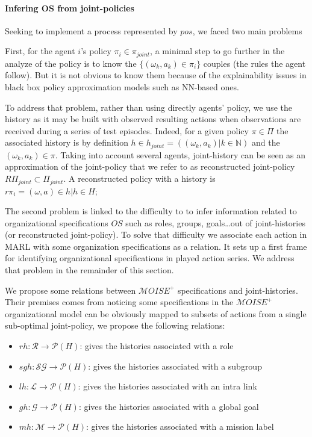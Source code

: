 \documentclass{ecai}
\newcounter{relation}
\begin{document}
\paragraph{\textbf{Infering OS from joint-policies}}

Seeking to implement a process represented by $pos$, we faced two main problems

First, for the agent $i$'s policy $\pi_{i} \in \pi_{joint}$, a minimal step to go further in the analyze of the policy is to know the $\{(\omega_k, a_k) \in \pi_{i}\}$ couples (the rules the agent follow). But it is not obvious to know them because of the explainability issues in black box policy approximation models such as NN-based ones.

To address that problem, rather than using directly agents' policy, we use the history as it may be built with observed resulting actions when observations are received during a series of test episodes. Indeed, for a given policy $\pi \in \Pi$ the associated history is by definition $h \in h_{joint} = ((\omega_k,a_k) | k \in \mathbb{N})$ and the $(\omega_k,a_k) \in \pi$. Taking into account several agents, joint-history can be seen as an approximation of the joint-policy that we refer to as reconstructed joint-policy $R\Pi_{joint} \subset \Pi_{joint}$. A reconstructed policy with a history is $r\pi_i = {(\omega, a) \in h | h \in H}$;

The second problem is linked to the difficulty to to infer information related to organizational specifications $OS$ such as roles, groups, goals\dots out of joint-histories (or reconstructed joint-policy).
To solve that difficulty we associate each action in MARL with some organization specifications as a  relation. It sets up a first frame for identifying organizational specifications in played action series. We address that problem in the remainder of this section.

We propose some relations between $\mathcal{M}OISE^+$ specifications and joint-histories. Their premises comes from noticing some specifications in the $\mathcal{M}OISE^+$ organizational model can be obviously mapped to subsets of actions from a single sub-optimal joint-policy, we propose the following relations:

\begin{itemize}
    \item $rh: \mathcal{R} \rightarrow \mathcal{P}(H)$: gives the histories associated with a role
    \item $sgh: \mathcal{SG} \rightarrow \mathcal{P}(H)$: gives the histories associated with a subgroup
    \item $lh: \mathcal{L} \rightarrow \mathcal{P}(H)$: gives the histories associated with an intra link
    \item $gh: \mathcal{G} \rightarrow \mathcal{P}(H)$: gives the histories associated with a global goal
    \item $mh: \mathcal{M} \rightarrow \mathcal{P}(H)$: gives the histories associated with a mission label
\end{itemize}
\end{document}
